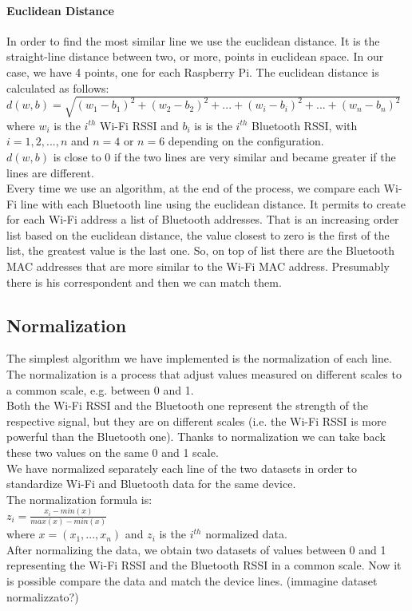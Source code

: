 \paragraph{Euclidean Distance}
In order to find the most similar line we use the euclidean distance. It is the straight-line distance between two, or more, points in euclidean space. In our case, we have 4 points, one for each Raspberry Pi. The euclidean distance is calculated as follows:\\
\(d(w,b) = \sqrt{(w_1 - b_1)^2 + (w_2 - b_2)^2 +... + (w_i - b_i)^2 + ... + (w_n - b_n)^2}\)
where \(w_i\) is the \(i^{th}\) Wi-Fi RSSI and \(b_i\) is  is the \(i^{th}\) Bluetooth RSSI, with \(i = 1, 2, ..., n\) and \(n = 4\) or \( n = 6 \) depending on the configuration.\\
\(d(w,b)\) is close to 0 if the two lines are very similar and became greater if the lines are different.\\
\linebreak
Every time we use an algorithm, at the end of the process, we compare each Wi-Fi line with each Bluetooth line using the euclidean distance. It permits to create for each Wi-Fi address a list of Bluetooth addresses. That is an increasing order list based on the euclidean distance, the value closest to zero is the first of the list, the greatest value is the last one. So, on top of list there are the Bluetooth MAC addresses that are more similar to the Wi-Fi MAC address. Presumably there is his correspondent and then we can match them.

\subsection{Normalization}
The simplest algorithm we have implemented is the normalization of each line.\\
The normalization is a process that adjust values measured on different scales to a common scale, e.g. between 0 and 1.\\
Both the Wi-Fi RSSI and the Bluetooth one represent the strength of the respective signal, but they are on different scales (i.e. the Wi-Fi RSSI is more powerful than the Bluetooth one). Thanks to normalization we can take back these two values on the same 0 and 1 scale.\\
\linebreak
We have normalized separately each line of the two datasets in order to standardize Wi-Fi and Bluetooth data for the same device.\\
The normalization formula is:\\
\( z_i = \frac{x_i-min(x)}{max(x)-min(x)} \)\\
where \( x=(x_1,..., x_n)\) and \(z_i\) is the \(i^{th}\) normalized data.\\
\linebreak
After normalizing the data, we obtain two datasets of values between 0 and 1 representing the Wi-Fi RSSI and the Bluetooth RSSI in a common scale. Now it is possible compare the data and match the device lines.
(immagine dataset normalizzato?)

